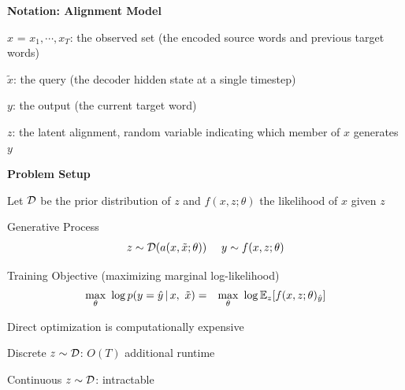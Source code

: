 \documentclass[aspectratio=169]{beamer}
\let\tempone\itemize
\let\temptwo\enditemize
\renewenvironment{itemize}{\tempone\addtolength{\itemsep}{0.5\baselineskip}}{\temptwo}
\newcommand{\thetitle}[1]{{\begin{center}\textbf{{#1}}\end{center}}}
\newcommand{\air}{\vspace{0.25cm}}
\begin{document}
\begin{frame}\thetitle{Notation: Alignment Model}
\begin{itemize}
    \item $x$ = $x_1,\cdots, x_T$: the observed set (the encoded source words
        and previous target words)
    \item $\tilde{x}$: the query (the decoder hidden state at a single timestep)
    \item $y$: the output (the current target word)
    \item $z$: the latent alignment, random variable indicating which member of $x$ generates $y$
\air
\begin{figure}
\centering
{}
\end{figure}
\end{itemize}
\end{frame}

\begin{frame}\thetitle{Problem Setup}
\begin{itemize}
\item Let $\mathcal{D}$ be the prior distribution of $z$ and $f(x,z;\theta)$ the
likelihood of $x$ given $z$
\item Generative Process
    \begin{eqnarray*}
        z \sim {\mathcal{D}}(a(x, \tilde{x};\theta )) \ \ \ \  y \sim f(x, z; \theta)
    \end{eqnarray*}
\item Training Objective (maximizing marginal log-likelihood)
    \begin{eqnarray*}
        \max_{\theta}\ \log p(y = \hat{y} \,|\,  x, \ \tilde{x}) &=& \max_{\theta} \ \log \mathbb{E}_z [f(x, z;\theta)_{\hat{y}}]
    \end{eqnarray*}
\item Direct optimization is computationally expensive
    \begin{itemize}
        \item Discrete $z\sim{\mathcal{D}}$: $O(T)$ additional runtime
        \item Continuous ${z\sim\mathcal{D}}$: intractable
    \end{itemize}
\end{itemize}
\end{frame}
\end{document}
